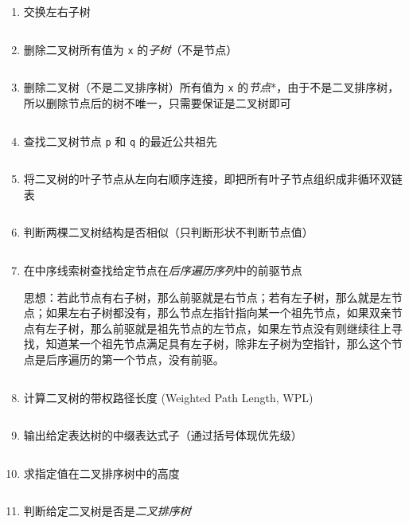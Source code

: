 \documentclass{ctexart}
\begin{document}
\begin{enumerate}
    \item 交换左右子树
        \inputminted{c}{codes/swap-bitree.c}

    \item 删除二叉树所有值为 \texttt{x} 的\emph{子树}（不是节点）
        \inputminted{c}{codes/delete-all-subtree-x-from-bitree.c}

    \item 删除二叉树（不是二叉排序树）所有值为 \texttt{x} 的\emph{节点}*，由于不是二叉排序树，所以删除节点后的树不唯一，只需要保证是二叉树即可
        \inputminted{c}{codes/delete-all-x-from-bitree.c}

    \item 查找二叉树节点 \texttt{p} 和 \texttt{q} 的最近公共祖先
        \inputminted{c}{codes/common-ancestor.c}

    \item 将二叉树的叶子节点从左向右顺序连接，即把所有叶子节点组织成非循环双链表
        \inputminted{c}{codes/link-leafs-of-bitree.c}

    \item 判断两棵二叉树结构是否相似（只判断形状不判断节点值）
        \inputminted{c}{codes/is-same-bitree.c}

    \item 在中序线索树查找给定节点在\emph{后序遍历序列}中的前驱节点

        思想：若此节点有右子树，那么前驱就是右节点；若有左子树，那么就是左节点；如果左右子树都没有，那么节点左指针指向某一个祖先节点，如果双亲节点有左子树，那么前驱就是祖先节点的左节点，如果左节点没有则继续往上寻找，知道某一个祖先节点满足具有左子树，除非左子树为空指针，那么这个节点是后序遍历的第一个节点，没有前驱。
        \inputminted{c}{codes/find-previous-node-of-postorder-in-inthreadtree.c}

    \item 计算二叉树的带权路径长度 (Weighted Path Length, WPL)
        \inputminted{c}{codes/weighted-path-length-of-bitree.c}

    \item 输出给定表达树的中缀表达式子（通过括号体现优先级）
        \inputminted{c}{codes/print-expression-bitree.c}

    \item 求指定值在二叉排序树中的高度
        \inputminted{c}{codes/height-of-value-in-bsttree.c}

    \item 判断给定二叉树是否是\emph{二叉排序树}
        \inputminted{c}{codes/is-bsttree.c}



\end{enumerate}
\end{document}
